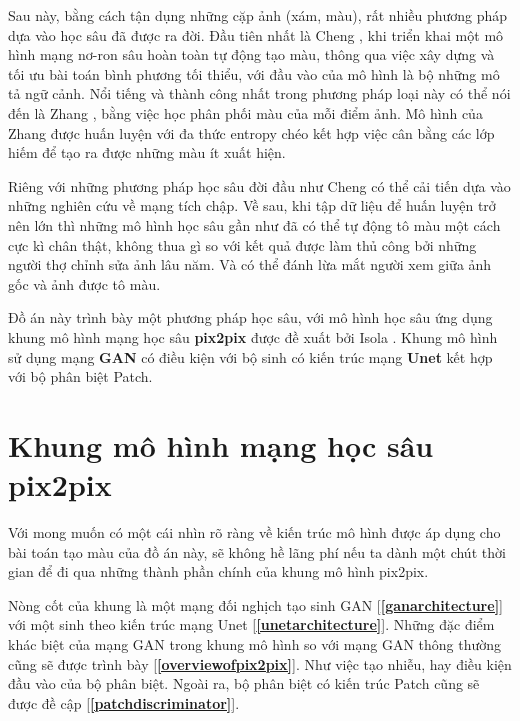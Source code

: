 \documentclass[a4paper, 12pt]{report}
\begin{document}
Sau này, bằng cách tận dụng những cặp ảnh (xám, màu), rất nhiều phương pháp dựa vào học sâu đã được ra đời.
Đầu tiên nhất là Cheng \cite{chengcolorization}, khi triển khai một mô hình mạng nơ-ron sâu hoàn toàn tự động tạo màu, thông qua việc xây dựng và tối ưu bài toán bình phương tối thiểu, với đầu vào của mô hình là bộ những mô tả ngữ cảnh.
Nổi tiếng và thành công nhất trong phương pháp loại này có thể nói đến là Zhang \cite{zhangcolorization}, bằng việc học phân phối màu của mỗi điểm ảnh.
Mô hình của Zhang được huấn luyện với đa thức entropy chéo kết hợp việc cân bằng các lớp hiếm để tạo ra được những màu ít xuất hiện.\vspace{5pt}

Riêng với những phương pháp học sâu đời đầu như Cheng có thể cải tiến dựa vào những nghiên cứu về mạng tích chập.
Về sau, khi tập dữ liệu để huấn luyện trở nên lớn thì những mô hình học sâu gần như đã có thể tự động tô màu một cách cực kì chân thật, không thua gì so với kết quả được làm thủ công bởi những người thợ chỉnh sửa ảnh lâu năm.
Và có thể đánh lừa mắt người xem giữa ảnh gốc và ảnh được tô màu.\vspace{5pt}

Đồ án này trình bày một phương pháp học sâu, với mô hình học sâu ứng dụng khung mô hình mạng học sâu \textbf{pix2pix} được đề xuất bởi Isola \cite{isola2018imagetoimage}.
Khung mô hình sử dụng mạng \textbf{GAN} \cite{goodfellow2014generative} có điều kiện với bộ sinh có kiến trúc mạng \textbf{Unet} \cite{ronneberger2015unet} kết hợp với bộ phân biệt Patch.

\chapter{Khung mô hình mạng học sâu pix2pix}\label{pix2pixframework}

Với mong muốn có một cái nhìn rõ ràng về kiến trúc mô hình được áp dụng cho bài toán tạo màu của đồ án này, sẽ không hề lãng phí nếu ta dành một chút thời gian để đi qua những thành phần chính của khung mô hình pix2pix.\vspace{5pt}

Nòng cốt của khung là một mạng đối nghịch tạo sinh GAN [\textbf{\ref{ganarchitecture}}] với một sinh theo kiến trúc mạng Unet [\textbf{\ref{unetarchitecture}}].
Những đặc điểm khác biệt của mạng GAN trong khung mô hình so với mạng GAN thông thường cũng sẽ được trình bày [\textbf{\ref{overviewofpix2pix}}].
Như việc tạo nhiễu, hay điều kiện đầu vào của bộ phân biệt.
Ngoài ra, bộ phân biệt có kiến trúc Patch cũng sẽ được đề cập [\textbf{\ref{patchdiscriminator}}].
\end{document}
